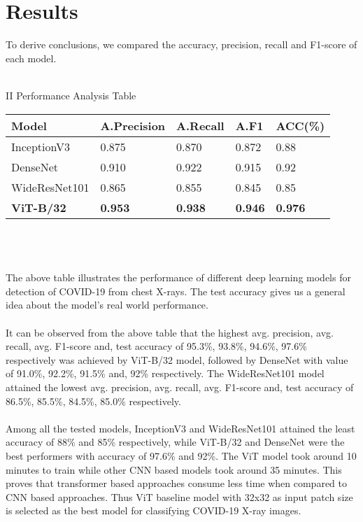 \documentclass[conference]{IEEEtran}
\begin{document}
    
    
    
    

\section{\normalsize{Results}}
    To derive conclusions, we compared the accuracy, precision, recall and F1-score of each model.\\\\
    \centerline{\footnotesize{II Performance Analysis Table}}
    
   \noindent \begin{tabular}{|p{21mm}|p{15mm}|p{12mm}|p{10mm}|p{11mm}|}
    
    \hline
    Model & A.Precision & A.Recall & A.F1 & ACC(\%)\\
    \hline
    InceptionV3    & 0.875 & 0.870 & 0.872 & 0.88\\
    DenseNet       & 0.910 & 0.922 & 0.915 & 0.92\\
    WideResNet101  & 0.865 & 0.855 & 0.845 & 0.85\\
    \textbf{ViT-B/32}   & \textbf{0.953} & \textbf{0.938} & \textbf{0.946} & \textbf{0.976}\\
    \hline
    \end{tabular}\\\\\\
    The above table illustrates the performance of different deep learning models for detection of COVID-19 from chest X-rays. The test accuracy gives us a general idea about the model's real world performance.\\\\
    It can be observed from the above table that the highest avg. precision, avg. recall, avg. F1-score and, test accuracy of 95.3\%, 93.8\%, 94.6\%, 97.6\% respectively was achieved by ViT-B/32\cite{dosovitskiy2021image} model, followed by DenseNet\cite{huang2018densely} with value of 91.0\%, 92.2\%, 91.5\% and, 92\% respectively. The WideResNet101\cite{DBLP:journals/corr/ZagoruykoK16} model attained the lowest avg. precision, avg. recall, avg. F1-score and, test accuracy of 86.5\%, 85.5\%, 84.5\%, 85.0\% respectively.\\\\
    Among all the tested models, InceptionV3\cite{szegedy2015rethinking} and WideResNet101\cite{DBLP:journals/corr/ZagoruykoK16} attained the least accuracy of 88\% and 85\% respectively, while ViT-B/32\cite{dosovitskiy2021image} and DenseNet\cite{huang2018densely} were the best performers with accuracy of 97.6\% and 92\%. The ViT\cite{dosovitskiy2021image} model took around 10 minutes to train while other CNN based models took around 35 minutes. This proves that transformer based approaches consume less time when compared to CNN based approaches.
    Thus ViT\cite{dosovitskiy2021image} baseline model with 32x32 as input patch size is selected as the best model for classifying COVID-19 X-ray images.
\end{document}
